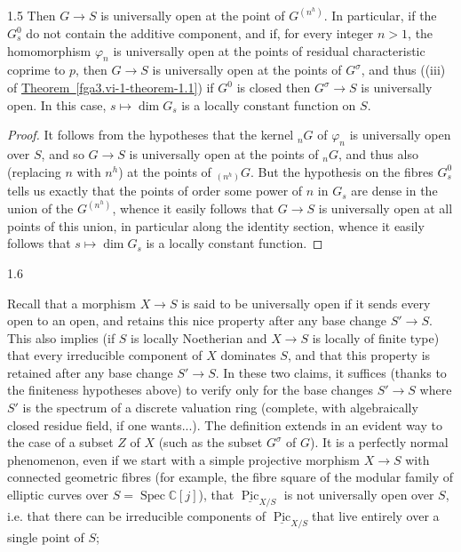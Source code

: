 \begin{corollary}{1.5}
    Then \(G\to  S\) is universally open at the point of \(G^{(n^h)}\).
    In particular, if the \(G_s^0\) do not contain the additive component, and if, for every integer \(n>1\), the homomorphism \(\varphi _n\) is universally open at the points of residual characteristic coprime to \(p\), then \(G\to  S\) is universally open at the points of \(G^\sigma \), and thus ((iii) of \hyperref[fga3.vi-1-theorem-1.1]{Theorem~\ref*{fga3.vi-1-theorem-1.1}}) if \(G^0\) is closed then \(G^\sigma \to  S\) is universally open.
    In this case, \(s\mapsto \dim  G_s\) is a locally constant function on \(S\).\begin{proof}\par{}It follows from the hypotheses that the kernel \({}_nG\) of \(\varphi _n\) is universally open over \(S\), and so \(G\to  S\) is universally open at the points of \({}_nG\), and thus also (replacing \(n\) with \(n^h\)) at the points of \({}_{(n^h)}G\).
      But the hypothesis on the fibres \(G_s^0\) tells us exactly that the points of order some power of \(n\) in \(G_s\) are dense in the union of the \(G^{(n^h)}\), whence it easily follows that \(G\to  S\) is universally open at all points of this union, in particular along the identity section, whence it easily follows that \(s\mapsto \dim  G_s\) is a locally constant function.\end{proof}\end{corollary}\begin{remark}{1.6}\label{fga3.vi-1-remark-1.6}\skipsinglepar\par{}Recall that a morphism \(X\to  S\) is said to be universally open if it sends every open to an open, and retains this nice property after any base change \(S'\to  S\).
    This also implies (if \(S\) is locally Noetherian and \(X\to  S\) is locally of finite type) that every irreducible component of \(X\) dominates \(S\), and that this property is retained after any base change \(S'\to  S\).
    In these two claims, it suffices (thanks to the finiteness hypotheses above) to verify only for the base changes \(S'\to  S\) where \(S'\) is the spectrum of a discrete valuation ring (complete, with algebraically closed residue field, if one wants...).
    The definition extends in an evident way to the case of a subset \(Z\) of \(X\) (such as the subset \(G^\sigma \) of \(G\)).
    It is a perfectly normal phenomenon, even if we start with a simple projective morphism \(X\to  S\) with connected geometric fibres (for example, the fibre square of the modular family of elliptic curves over \(S=\operatorname {Spec}\mathbb {C}[j]\)), that \(\underline {\operatorname {Pic}}_{X/S}\) is not universally open over \(S\), i.e. that there can be irreducible components of \(\underline {\operatorname {Pic}}_{X/S}\)that live entirely over a single point of \(S\);

\end{remark}
